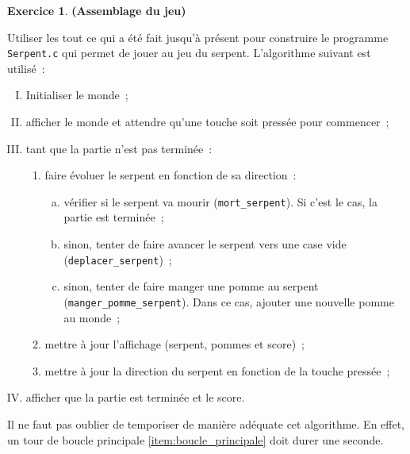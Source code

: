 \documentclass[12pt]{article}
\theoremstyle{definition}
\newtheorem{Exercice}{Exercice}
\begin{document}
\begin{Exercice} {\bf (Assemblage du jeu)}\smallskip

Utiliser les tout ce qui a été fait jusqu'à présent pour construire le
programme {\tt Serpent.c} qui permet de jouer au jeu du serpent.
L'algorithme suivant est utilisé~:
\smallskip

\begin{enumerate}[(I)]
    \item Initialiser le monde~;
    \item afficher le monde et attendre qu'une touche soit pressée pour
    commencer~;
    \item \label{item:boucle_principale}
    tant que la partie n'est pas terminée~:
    \begin{enumerate}[(1)]
        \item faire évoluer le serpent en fonction de sa direction~:
        \begin{enumerate}[(a)]
            \item vérifier si le serpent va mourir ({\tt mort\_serpent}).
            Si c'est le cas, la partie est terminée~;
            \item sinon, tenter de faire avancer le serpent vers une case vide
            ({\tt deplacer\_serpent})~;
            \item sinon, tenter de faire manger une pomme au serpent
            ({\tt manger\_pomme\_serpent}).
            Dans ce cas, ajouter une nouvelle pomme au monde~;
        \end{enumerate}
        \item mettre à jour l'affichage (serpent, pommes et score)~;
        \item mettre à jour la direction du serpent en fonction de la
        touche pressée~;
    \end{enumerate}
    \item afficher que la partie est terminée et le score.
\end{enumerate}
\medskip

Il ne faut pas oublier de temporiser de manière adéquate cet
algorithme. En effet, un tour de boucle
principale \eqref{item:boucle_principale} doit durer une seconde.
\end{Exercice}
\bigskip
\end{document}
